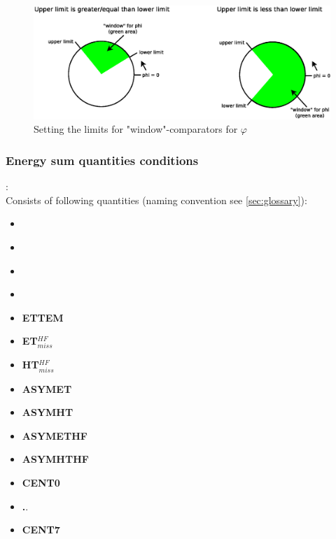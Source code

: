 \begin{figure}[htb]
\centering
\includegraphics[width=15cm]{figures/phi_windows_comparator}
\caption{Setting the limits for "window"-comparators for $\varphi$} 
\label{fig:gtl:phi_windows_comparator}
\end{figure}

\clearpage

\subsubsection{Energy sum quantities conditions}
\label{sec:gtl:esums_conditions}

\textbf{\esums}:\\ Consists of following quantities (naming convention see \ref{sec:glossary}):
\begin{itemize}
\item \textbf{\ett}
\item \textbf{\htt}
\item \textbf{\etm}
\item \textbf{\htm}
\item \textbf{ETTEM}
\item \textbf{ET$_{miss}^{HF}$}
\item \textbf{HT$_{miss}^{HF}$}
\item \textbf{ASYMET}
\item \textbf{ASYMHT}
\item \textbf{ASYMETHF}
\item \textbf{ASYMHTHF}
\item \textbf{CENT0}
\item \textbf..
\item \textbf{CENT7}
\end{itemize}

